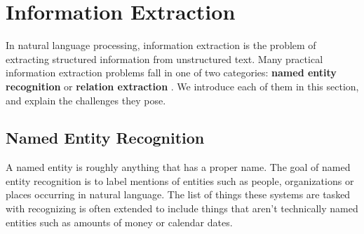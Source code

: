 \section{Information Extraction}
\label{information_extraction}
In natural language processing, information extraction is the problem of extracting structured information from unstructured text. Many practical information extraction problems fall in one of two categories: \textbf{named entity recognition} or \textbf{relation extraction} \citep{jurafsky09}. We introduce each of them in this section, and explain the challenges they pose.

\subsection{Named Entity Recognition}
\label{named_entity_recognition}
A named entity is roughly anything that has a proper name. The goal of named entity recognition is to label mentions of entities such as people, organizations or places occurring in natural language. The list of things these systems are tasked with recognizing is often extended to include things that aren't technically named entities such as amounts of money or calendar dates.

